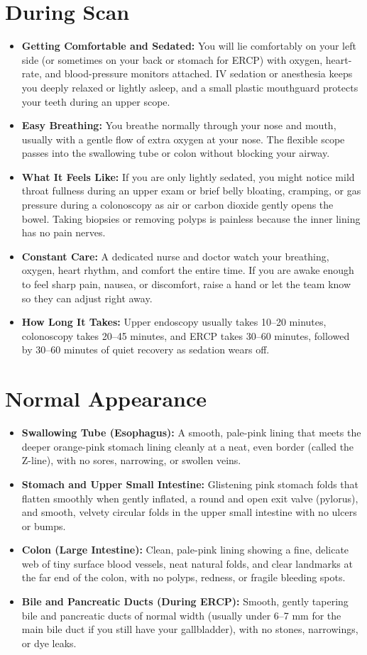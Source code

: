\section{During Scan}
\begin{itemize}
\item \textbf{Getting Comfortable and Sedated:} You will lie comfortably on your left side (or sometimes on your back or stomach for ERCP) with oxygen, heart-rate, and blood-pressure monitors attached. IV sedation or anesthesia keeps you deeply relaxed or lightly asleep, and a small plastic mouthguard protects your teeth during an upper scope.
\item \textbf{Easy Breathing:} You breathe normally through your nose and mouth, usually with a gentle flow of extra oxygen at your nose. The flexible scope passes into the swallowing tube or colon without blocking your airway.
\item \textbf{What It Feels Like:} If you are only lightly sedated, you might notice mild throat fullness during an upper exam or brief belly bloating, cramping, or gas pressure during a colonoscopy as air or carbon dioxide gently opens the bowel. Taking biopsies or removing polyps is painless because the inner lining has no pain nerves.
\item \textbf{Constant Care:} A dedicated nurse and doctor watch your breathing, oxygen, heart rhythm, and comfort the entire time. If you are awake enough to feel sharp pain, nausea, or discomfort, raise a hand or let the team know so they can adjust right away.
\item \textbf{How Long It Takes:} Upper endoscopy usually takes 10--20 minutes, colonoscopy takes 20--45 minutes, and ERCP takes 30--60 minutes, followed by 30--60 minutes of quiet recovery as sedation wears off.
\end{itemize}


\section{Normal Appearance}
\begin{itemize}
\item \textbf{Swallowing Tube (Esophagus):} A smooth, pale-pink lining that meets the deeper orange-pink stomach lining cleanly at a neat, even border (called the Z-line), with no sores, narrowing, or swollen veins.
\item \textbf{Stomach and Upper Small Intestine:} Glistening pink stomach folds that flatten smoothly when gently inflated, a round and open exit valve (pylorus), and smooth, velvety circular folds in the upper small intestine with no ulcers or bumps.
\item \textbf{Colon (Large Intestine):} Clean, pale-pink lining showing a fine, delicate web of tiny surface blood vessels, neat natural folds, and clear landmarks at the far end of the colon, with no polyps, redness, or fragile bleeding spots.
\item \textbf{Bile and Pancreatic Ducts (During ERCP):} Smooth, gently tapering bile and pancreatic ducts of normal width (usually under 6--7 mm for the main bile duct if you still have your gallbladder), with no stones, narrowings, or dye leaks.
\end{itemize}


